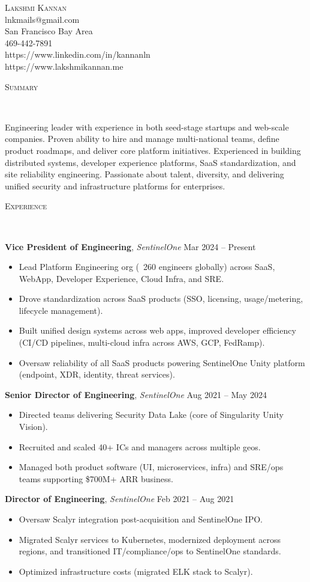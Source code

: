 \documentclass[9pt]{article}
\newenvironment{changemargin}[2]{%
  \begin{list}{}{%
    \setlength{\topsep}{0pt}%
    \setlength{\leftmargin}{#1}%
    \setlength{\rightmargin}{#2}%
    \setlength{\listparindent}{\parindent}%
    \setlength{\itemindent}{\parindent}%
    \setlength{\parsep}{\parskip}%
  }%
  \item[]}{\end{list}
}
\newcommand{\lineover}{
        \begin{changemargin}{-0.05in}{-0.05in}
                \vspace*{-8pt}
                \hrulefill \\
                \vspace*{-2pt}
        \end{changemargin}
}
\newcommand{\header}[1]{
        \begin{changemargin}{-0.5in}{-0.5in}
                \scshape{#1}\\
        \lineover
        \end{changemargin}
}
\newcommand{\contact}[6]{
        \begin{changemargin}{-0.5in}{-0.5in}
                \begin{center}
                        {\Large \scshape {#1}}\\ \smallskip
                        {#2}\\ \smallskip
                        {#3}\\ \smallskip
      {#4}\\ \smallskip
                        {#5}\\ \smallskip
                        {#6}\smallskip
                \end{center}
        \end{changemargin}
}
\newenvironment{body} {
        \vspace*{-16pt}
        \begin{changemargin}{-0.25in}{-0.5in}
  }
        {\end{changemargin}
}
\begin{document}
\contact{Lakshmi Kannan}{lnkmails@gmail.com}{San Francisco Bay Area}{469-442-7891}{https://www.linkedin.com/in/kannanln}{https://www.lakshmikannan.me}

\header{Summary}
\begin{body}
Engineering leader with experience in both seed-stage startups and web-scale companies.
Proven ability to hire and manage multi-national teams, define product roadmaps, and deliver core platform initiatives.
Experienced in building distributed systems, developer experience platforms, SaaS standardization, and site reliability engineering.
Passionate about talent, diversity, and delivering unified security and infrastructure platforms for enterprises.
\end{body}

\header{Experience}
\begin{body}

\textbf{Vice President of Engineering}, \emph{SentinelOne} \hfill Mar 2024 -- Present \\
\begin{itemize}
  \item Lead Platform Engineering org (~260 engineers globally) across SaaS, WebApp, Developer Experience, Cloud Infra, and SRE.
  \item Drove standardization across SaaS products (SSO, licensing, usage/metering, lifecycle management).
  \item Built unified design systems across web apps, improved developer efficiency (CI/CD pipelines, multi-cloud infra across AWS, GCP, FedRamp).
  \item Oversaw reliability of all SaaS products powering SentinelOne Unity platform (endpoint, XDR, identity, threat services).
\end{itemize}

\textbf{Senior Director of Engineering}, \emph{SentinelOne} \hfill Aug 2021 -- May 2024 \\
\begin{itemize}
  \item Directed teams delivering Security Data Lake (core of Singularity Unity Vision).
  \item Recruited and scaled 40+ ICs and managers across multiple geos.
  \item Managed both product software (UI, microservices, infra) and SRE/ops teams supporting \$700M+ ARR business.
\end{itemize}

\textbf{Director of Engineering}, \emph{SentinelOne} \hfill Feb 2021 -- Aug 2021 \\
\begin{itemize}
  \item Oversaw Scalyr integration post-acquisition and SentinelOne IPO.
  \item Migrated Scalyr services to Kubernetes, modernized deployment across regions, and transitioned IT/compliance/ops to SentinelOne standards.
  \item Optimized infrastructure costs (migrated ELK stack to Scalyr).
\end{itemize}


\end{body}
\end{document}

